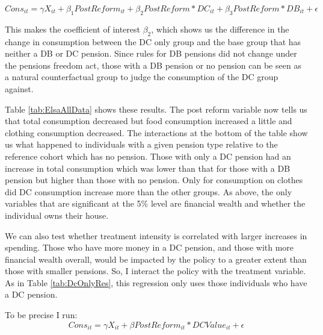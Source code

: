 \documentclass[12pt]{article}
\begin{document}
\begin{equation*}
    Cons_{it} =  \gamma X_{it} + \beta_{1} PostReform_{it} + \beta_{2} PostReform*DC_{it} + \beta_{3} PostReform*DB_{it}  + \epsilon
\end{equation*}


This makes the coefficient of interest $\beta_{2}$, which shows us the difference
in the change in consumption between the DC only group and the base group that has neither a DB or DC pension.
Since rules for DB pensions did not change under the pensions freedom act, those with a DB pension or no pension
can be seen as a natural counterfactual group to judge the consumption of the DC group against.

\begin{landscape}
    
\end{landscape}

Table \ref{tab:ElsaAllData} shows these results. The post reform variable
now tells us that total consumption decreased but food consumption increased a little and clothing consumption
decreased. The interactions at the bottom of the table show us what happened to individuals with a given pension
type relative to the reference cohort which has no pension. Those with only a DC pension had an increase in total consumption
which was lower than that for those with a DB pension but higher than those with no pension. Only for consumption on
clothes did DC consumption increase more than the other groups. As above, the only variables that are significant
at the 5\% level are financial wealth and whether the individual owns their house.

We can also test whether treatment intensity is correlated with larger increases in spending. Those who have
more money in a DC pension, and those with more financial wealth overall, would be impacted
by the policy to a greater extent than those with smaller pensions. So, I interact the policy with the treatment
variable. As in Table \ref{tab:DcOnlyRes}, this regression only uses those individuals who have a DC pension.

To be precise I run:
\begin{equation*}
    Cons_{it} =  \gamma X_{it} + \beta PostReform_{it}*DCValue_{it} + \epsilon
\end{equation*}

\begin{landscape}
    
\end{landscape}
\end{document}
